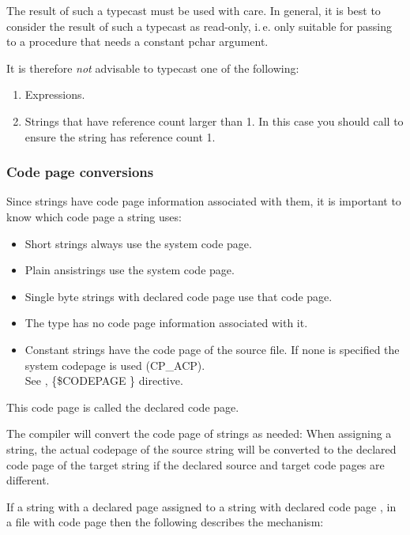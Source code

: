 The result of such a typecast must be used with care. In general, it is best
to consider the result of such a typecast as read-only, i.\,e. only suitable for
passing to a procedure that needs a constant pchar argument.

It is therefore {\em not} advisable to typecast one of the following:
\begin{enumerate}
\item Expressions.
\item Strings that have reference count larger than 1.
In this case you should call  to ensure the
string has reference count 1.
\end{enumerate}

\subsubsection{Code page conversions}
Since strings have code page information associated with them, it is important to know which code page a string uses:
\begin{itemize}
\item Short strings always use the system code page.
\item Plain ansistrings use the system code page.
\item Single byte strings with declared code page use that code page.
\item The  type has no code page information associated with it.
\item Constant strings have the code page of the source file.
If none is specified the system codepage is used (CP\_ACP).\\
See \progref, \{\$CODEPAGE \} directive.
\end{itemize}
This code page is called the declared code page.

The compiler will convert the code page of strings as needed: When assigning a string,
the actual codepage of the source string will be converted to the declared code
page of the target string if the declared source and target code pages are different.

If a string with a declared page  assigned to a string with
declared code page , in a file with code page  then
the following describes the mechanism:

